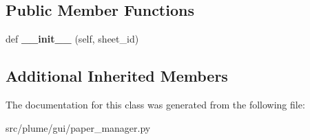 \subsection*{Public Member Functions}
\begin{DoxyCompactItemize}
\item 
def {\bfseries \+\_\+\+\_\+init\+\_\+\+\_\+} (self, sheet\+\_\+id)\hypertarget{classplume-creator_1_1src_1_1plume_1_1gui_1_1paper__manager_1_1_sheet_paper_a33c75319fb6640ebf733e8209bcc7c35}{}\label{classplume-creator_1_1src_1_1plume_1_1gui_1_1paper__manager_1_1_sheet_paper_a33c75319fb6640ebf733e8209bcc7c35}

\end{DoxyCompactItemize}
\subsection*{Additional Inherited Members}


The documentation for this class was generated from the following file\+:\begin{DoxyCompactItemize}
\item 
src/plume/gui/paper\+\_\+manager.\+py\end{DoxyCompactItemize}

